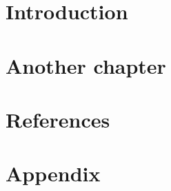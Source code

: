 \documentclass[headsepline,titlepage,twoside,12pt]{scrreprt}
\begin{document}
\tableofcontents

\chapter{Introduction}\label{ch:introduction}

\chapter{Another chapter}\label{ch:anotherchapter}


\chapter{References}\label{ch:references}



\chapter{Appendix}\label{ch:appendix}
\end{document}
